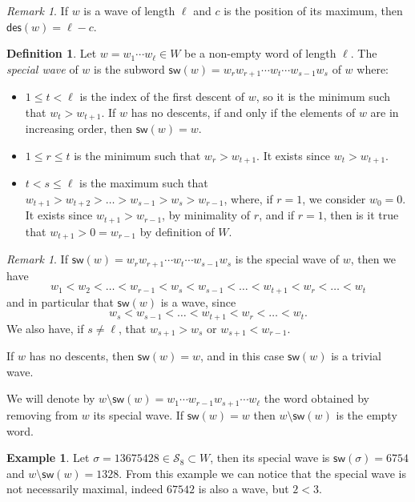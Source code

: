 \documentclass[a4paper]{amsart}
\newcommand{\des}{\mathsf{des}}
\newcommand{\sw}{\mathsf{sw}}
\theoremstyle{definition}
\newtheorem{definition}[theorem]{Definition}
\newtheorem{example}[theorem]{Example}
\theoremstyle{remark}
\newtheorem{remark}[theorem]{Remark}
\numberwithin{equation}{section}
\begin{document}
\begin{remark}
    If $w$ is a wave of length $\ell $ and $c$ is the position of its maximum, then $\des(w)=\ell-c$.
\end{remark}

\begin{definition}\label{def:special_wave}
    Let $w=w_1\cdots w_{\ell}\in W$ be a non-empty word of length $\ell $. The \textit{special wave} of $w$ is the subword $\sw(w)=w_rw_{r+1}\cdots w_t\cdots w_{s-1}w_s$ of $w$ where:
    \begin{itemize}
        \item $1\leq t<\ell$ is the index of the first descent of $w$, so it is the minimum such that $w_t>w_{t+1}$. If $w$ has no descents, if and only if the elements of $w$ are in increasing order, then $\sw(w)=w$.
        \item $1\leq r\leq t$ is the minimum such that $w_r>w_{t+1}$. It exists since $w_t>w_{t+1}$.
        \item $t<s\leq\ell$ is the maximum such that $w_{t+1}>w_{t+2}>\dots>w_{s-1}>w_s>w_{r-1}$, where, if $r=1$, we consider $w_0=0$. It exists since $w_{t+1}>w_{r-1}$, by minimality of $r$, and if $r=1$, then is it true that $w_{t+1}>0=w_{r-1}$ by definition of $W$.
    \end{itemize}    
\end{definition}

\begin{remark}
    If $\sw(w)=w_rw_{r+1}\cdots w_t\cdots w_{s-1}w_s$ is the special wave of $w$, then we have 
    \begin{equation}\label{eq:sw_order}
    w_1<w_2<\dots<w_{r-1}<w_s<w_{s-1}<\dots<w_{t+1}<w_r<\dots<w_t
    \end{equation}
    and in particular that $\sw(w)$ is a wave, since
    \begin{equation}
    w_s<w_{s-1}<\dots<w_{t+1}<w_r<\dots<w_t.
    \end{equation}
    We also have, if $s\neq\ell$, that $w_{s+1}>w_s$ or $w_{s+1}<w_{r-1}$.

    If $w$ has no descents, then $\sw(w)=w$, and in this case $\sw(w)$ is a trivial wave.
\end{remark}

We will denote by $w\setminus\sw(w)=w_1\cdots w_{r-1}w_{s+1}\cdots w_{\ell}$ the word obtained by removing from $w$ its special wave. If $\sw(w)=w$ then $w\setminus\sw(w)$ is the empty word.

\begin{example}\label{ex_sw}
Let $\sigma=13675428\in \mathcal{S}_8\subset W$, then its special wave is $\sw(\sigma)=6754$ and $w\setminus\sw(w)=1328$. From this example we can notice that the special wave is not necessarily maximal, indeed $67542$ is also a wave, but $2<3$.
\end{example}
\end{document}
